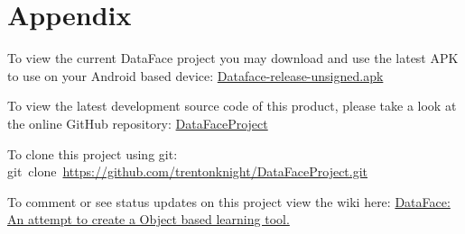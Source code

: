 \documentclass[fontsize=11pt, %
paper=a4, %
twoside, %
captions=tableheading,
index=totoc,
hyperref]{labbook}
\begin{document}
\chapter*{Appendix}
\begin{mdframed}[roundcorner=10pt,leftmargin=1, rightmargin=1, 
linecolor=green!40!brown!80,outerlinewidth=.9,
innerleftmargin=8,innertopmargin=8,innerbottommargin=8]
\begin{center}
\begin{minipage}[c]{1.0\textwidth}
To view the current DataFace project you may download and use the latest APK to use on your Android based device: \href{https://github.com/trentonknight/DataFaceProject/blob/master/DataFace/build/apk/DataFace-release-unsigned.apk?raw=true}{Dataface-release-unsigned.apk}
\end{minipage}
\end{center}
\end{mdframed}
\begin{mdframed}[roundcorner=10pt,leftmargin=1, rightmargin=1, 
linecolor=green!40!brown!80,outerlinewidth=.9,
innerleftmargin=8,innertopmargin=8,innerbottommargin=8]
\begin{center}
\begin{minipage}[c]{1.0\textwidth}
To view the latest development source code of this product, please take a look at the online GitHub repository: \href{https://github.com/trentonknight/DataFaceProject}{DataFaceProject}
\end{minipage}
\end{center}
\end{mdframed}
\begin{mdframed}[roundcorner=10pt,leftmargin=1, rightmargin=1, 
linecolor=green!40!brown!80,outerlinewidth=.9,
innerleftmargin=8,innertopmargin=8,innerbottommargin=8]
\begin{center}
\begin{minipage}[c]{1.0\textwidth}
To clone this project using git:\\ git~clone~\href{https://github.com/trentonknight/DataFaceProject.git}{https://github.com/trentonknight/DataFaceProject.git}
\end{minipage}
\end{center}
\end{mdframed}
\begin{mdframed}[roundcorner=10pt,leftmargin=1, rightmargin=1, 
linecolor=green!40!brown!80,outerlinewidth=.9,
innerleftmargin=8,innertopmargin=8,innerbottommargin=8]
\begin{center}
\begin{minipage}[c]{1.0\textwidth}
To comment or see status updates on this project view the wiki here: \href{https://github.com/trentonknight/DataFaceProject/wiki/DataFace:-An-attempt-to-create-a-Object-based-learning-tool.}{DataFace: An attempt to create a Object based learning tool.}
\end{minipage}
\end{center}
\end{mdframed}
\clearpage
\printbibliography
\end{document}
